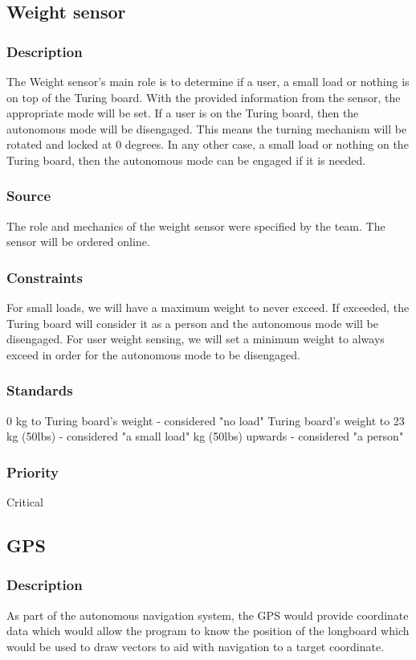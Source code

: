\subsection{Weight sensor}
\subsubsection{Description}
The Weight sensor's main role is to determine if a user, a small load or nothing is on top of the Turing board. With the provided information from the sensor, the appropriate mode will be set. If a user is on the Turing board, then the autonomous mode will be disengaged. This means the turning mechanism will be rotated and locked at 0 degrees. In any other case, a small load or nothing on the Turing board, then the autonomous mode can be engaged if it is needed. 
\subsubsection{Source}
The role and mechanics of the weight sensor were specified by the team. \hfill \break 
The sensor will be ordered online.
\subsubsection{Constraints}
For small loads, we will have a maximum weight to never exceed. If exceeded, the Turing board will consider it as a person and the autonomous mode will be disengaged. \hfill \break
For user weight sensing, we will set a minimum weight to always exceed in order for the autonomous mode to be disengaged.
\subsubsection{Standards}
0 kg to Turing board's weight - considered "no load" \hfill \break
Turing board's weight to 23 kg (50lbs) - considered "a small load" \hfill {} kg (50lbs) upwards - considered "a person"
\subsubsection{Priority}
Critical

\subsection{GPS}
\subsubsection{Description}
As part of the autonomous navigation system, the GPS would provide coordinate data which would allow the program to know the position of the longboard which would be used to draw vectors to aid with navigation to a target coordinate.
